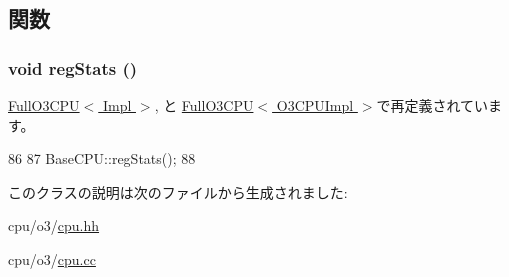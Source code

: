 \subsection{関数}
\hypertarget{classBaseO3CPU_a4dc637449366fcdfc4e764cdf12d9b11}{
\subsubsection[{regStats}]{\setlength{\rightskip}{0pt plus 5cm}void regStats ()}}
\label{classBaseO3CPU_a4dc637449366fcdfc4e764cdf12d9b11}


\hyperlink{classFullO3CPU_a4dc637449366fcdfc4e764cdf12d9b11}{FullO3CPU$<$ Impl $>$}, と \hyperlink{classFullO3CPU_a4dc637449366fcdfc4e764cdf12d9b11}{FullO3CPU$<$ O3CPUImpl $>$}で再定義されています。


\begin{DoxyCode}
86 {
87     BaseCPU::regStats();
88 }
\end{DoxyCode}


このクラスの説明は次のファイルから生成されました:\begin{DoxyCompactItemize}
\item 
cpu/o3/\hyperlink{o3_2cpu_8hh}{cpu.hh}\item 
cpu/o3/\hyperlink{o3_2cpu_8cc}{cpu.cc}\end{DoxyCompactItemize}
